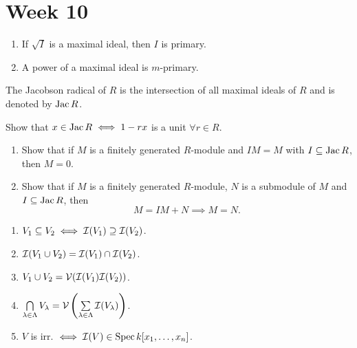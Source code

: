 
\section{Week 10}

\begin{exercise} \mbox{}
  \begin{enumerate}
    \item If $\sqrt{I}$ is a maximal ideal, then $I$ is primary.
    \item A power of a maximal ideal is $m$-primary.
  \end{enumerate}
\end{exercise}

\begin{exercise}
  \begin{definition}
    The Jacobson radical of $R$ is the intersection of all maximal ideals
    of $R$ and is denoted by $\operatorname{Jac} R$.
  \end{definition}
  Show that $x \in \operatorname{Jac} R \iff 1 - rx$ is a unit $\forall r \in R$.
\end{exercise}

\begin{exercise} \mbox{}
  \begin{enumerate}
    \item Show that if $M$ is a finitely generated $R$-module and $IM = M$
      with $I \subseteq \operatorname{Jac}  R$, then $M = 0$.
    \item Show that if $M$ is a finitely generated $R$-module, $N$ is a
      submodule of $M$ and $I\subseteq \operatorname{Jac} R$, then
      \[ M = IM + N \implies M = N. \]
  \end{enumerate}
\end{exercise}

\begin{exercise} \mbox{}
  \begin{enumerate}
    \item $V_1 \subseteq V_2 \iff \mathcal{I}(V_1) \supseteq \mathcal{I}(V_2)$.
    \item $\mathcal{I}(V_1 \cup V_2) = \mathcal{I}(V_1) \cap \mathcal{I}(V_2)$.
    \item $V_1 \cup V_2 = \mathcal{V}(\mathcal{I}(V_1) \mathcal{I}(V_2))$.
    \item $\bigcap\limits_{\lambda \in \Lambda} V_\lambda =
      \mathcal{V}\left(\sum\limits_{\lambda \in \Lambda} \mathcal{I}(V_\lambda)\right)$.
    \item $V$ is irr. $\iff \mathcal{I}(V) \in \operatorname{Spec} k[x_1, \dots, x_n]$.
  \end{enumerate}
\end{exercise}

